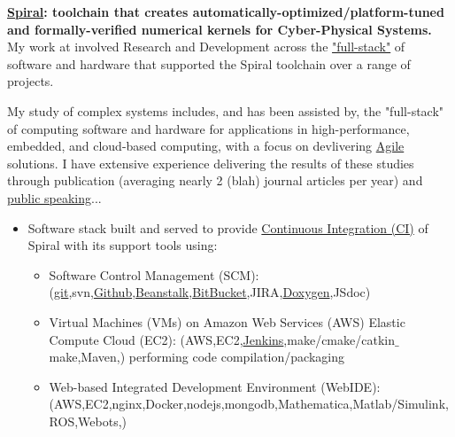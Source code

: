 \documentclass{article}
\begin{document}

\vspace{1mm}
\par
\textbf{\href{http://spiral.net/}{Spiral}: toolchain that creates automatically-optimized/platform-tuned and formally-verified  numerical kernels for Cyber-Physical Systems.}
\vspace{1mm}
My work at involved Research and Development across the \href{https://www.google.com/search?q=full+stack+software&oq=full+stack+software&aqs=chrome..69i57.2623j0j7&sourceid=chrome&es_sm=122&ie=UTF-8}{"full-stack"} of software and hardware that supported the Spiral toolchain over a range of projects. 


My study of complex systems includes, and has been assisted by, the "full-stack" of computing software and hardware for applications in high-performance, embedded, and cloud-based computing, with a focus on devlivering \href{https://en.wikipedia.org/wiki/Agile_software_development}{Agile} solutions. I have extensive experience delivering the results of these studies through publication (averaging nearly 2 (blah) journal articles per year) and \href{https://www.youtube.com/watch?v=rjbEWeu2Nwc&feature=youtu.be#t=51m53s}{public speaking}...


  \begin{itemize}
    \item Software stack built and served to provide \href{http://en.wikipedia.org/wiki/Continuous_integration}{Continuous Integration  (CI)} of Spiral with its support tools using:
    \begin{itemize}
      \item Software Control Management (SCM): (\href{https://git-scm.com/}{git},svn,\href{https://github.com/spiralgen}{Github},\href{http://beanstalkapp.com/}{Beanstalk},\href{https://bitbucket.org/}{BitBucket},JIRA,\href{http://www.doxygen.org/}{Doxygen},JSdoc) 
      \item Virtual Machines (VMs) on Amazon Web Services (AWS) Elastic Compute Cloud (EC2): (AWS,EC2,\href{http://jenkins-ci.org/}{Jenkins},make/cmake/catkin$\_$make,Maven,)  performing code compilation/packaging
      \item Web-based Integrated Development Environment (WebIDE): (AWS,EC2,nginx,Docker,nodejs,mongodb,Mathematica,Matlab/Simulink,ROS,Webots,)
    \end{itemize}
  \end{itemize}
\end{document}
